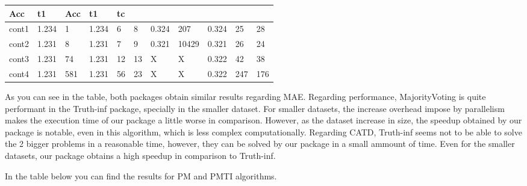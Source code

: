 \documentclass[letterpaper,10pt,english]{sphinxmanual}
\begin{document}
\begin{savenotes}
\begin{tabulary}{\linewidth}[t]{|T|T|T|T|T|T|T|T|T|T|T|}
Acc
&\sphinxstyletheadfamily 
t1
&\sphinxstyletheadfamily 
Acc
&\sphinxstyletheadfamily 
t1
&\sphinxstyletheadfamily 
tc
\\
\hline
cont1
&
1.234
&
1
&
1.234
&
6
&
8
&
0.324
&
207
&
0.324
&
25
&
28
\\
\hline
cont2
&
1.231
&
8
&
1.231
&
7
&
9
&
0.321
&
10429
&
0.321
&
26
&
24
\\
\hline
cont3
&
1.231
&
74
&
1.231
&
12
&
13
&
X
&
X
&
0.322
&
42
&
38
\\
\hline
cont4
&
1.231
&
581
&
1.231
&
56
&
23
&
X
&
X
&
0.322
&
247
&
176
\\
\hline
\end{tabulary}
\par
\sphinxattableend\end{savenotes}

As you can see in the table, both packages obtain similar results regarding MAE. Regarding performance,
MajorityVoting is quite performant in the Truth-inf package, specially in the smaller dataset. For smaller datasets,
the increase overhead impose by parallelism makes the execution time of our package a little worse in comparison.
However, as the dataset increase in size, the speedup obtained by our package is notable, even in this algorithm,
which is less complex computationally. Regarding CATD, Truth-inf seems not to be able to solve the 2 bigger problems
in a reasonable time, however, they can be solved by our package in a small ammount of time. Even for the smaller
datasets, our package obtains a high speedup in comparison to Truth-inf.

In the table below you can find the results for PM and PMTI algorithms.
\end{document}
